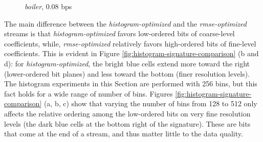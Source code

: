 \begin{figure}[h]
	\centering
	\caption{\emph{boiler}, 0.08 bps}
	\label{fig:histogram-stream-comparison}
\end{figure}


The main difference between the \emph{histogram-optimized} and the \emph{rmse-optimized} streams is
that \emph{histogram-optimized} favors low-ordered bits of coarse-level coefficients, while,
\emph{rmse-optimized} relatively favors high-ordered bits of fine-level coefficients. This is
evident in Figure \ref{fig:histogram-signature-comparison} (b and d): for
\emph{histogram-optimized}, the bright blue cells extend more toward the right (lower-ordered bit
planes) and less toward the bottom (finer resolution levels). The histogram experiments in this
Section are performed with 256 bins, but this fact holds for a wide range of number of bins. Figures
\ref{fig:histogram-signature-comparison} (a, b, c) show that varying the number of bins from 128 to
512 only affects the relative ordering among the low-ordered bits on very fine resolution levels
(the dark blue cells at the bottom right of the signature). These are bits that come at the end of a
stream, and thus matter little to the data quality. 

